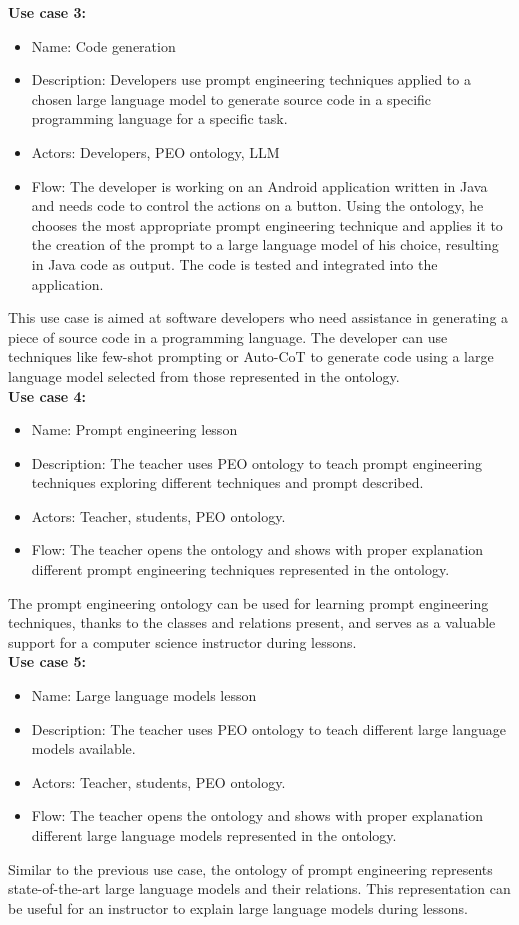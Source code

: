 \textbf{Use case 3:}
\begin{itemize}
    \item Name: Code generation
    \item Description: Developers use prompt engineering techniques applied to a chosen large language model to generate source code in a specific programming language for a specific task.
    \item Actors: Developers, PEO ontology, LLM
    \item Flow: The developer is working on an Android application written in Java and needs code to control the actions on a button. Using the ontology, he chooses the most appropriate prompt engineering technique and applies it to the creation of the prompt to a large language model of his choice,  resulting in Java code as output. The code is tested and integrated into the application. 
\end{itemize}
This use case is aimed at software developers who need assistance in generating a piece of source code in a programming language. The developer can use techniques like few-shot prompting or Auto-CoT to generate code using a large language model selected from those represented in the ontology. \\ 

\textbf{Use case 4:}
\begin{itemize}
    \item Name: Prompt engineering lesson
    \item Description: The teacher uses PEO ontology to teach prompt engineering techniques exploring different techniques and prompt described. 
    \item Actors: Teacher, students, PEO ontology. 
    \item Flow: The teacher opens the ontology and shows with proper explanation different prompt engineering techniques represented in the ontology.
\end{itemize}
The prompt engineering ontology can be used for learning prompt engineering techniques, thanks to the classes and relations present, and serves as a valuable support for a computer science instructor during lessons.\\

\textbf{Use case 5:}
\begin{itemize}
    \item Name: Large language models lesson
    \item Description: The teacher uses PEO ontology to teach different large language models available.
    \item Actors: Teacher, students, PEO ontology.
    \item Flow: The teacher opens the ontology and shows with proper explanation different large language models represented in the ontology. 
\end{itemize}
Similar to the previous use case, the ontology of prompt engineering represents state-of-the-art large language models and their relations. This representation can be useful for an instructor to explain large language models during lessons. \\


